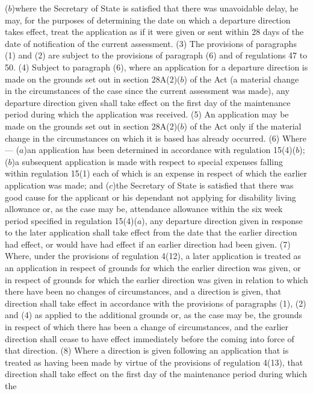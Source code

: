 \documentclass[a4paper]{article}
\begin{document}
($b$)where the Secretary of State is satisfied that there was unavoidable delay,
he may, for the purposes of determining the date on which a departure direction
takes effect, treat the application as if it were given or sent within 28 days
of the date of notification of the current assessment.
(3) The provisions of paragraphs (1) and (2) are subject to the provisions of
paragraph (6) and of regulations 47 to 50.
(4) Subject to paragraph (6), where an application for a departure direction is
made on the grounds set out in section 28A(2)($b$) of the Act (a material change
in the circumstances of the case since the current assessment was made), any
departure direction given shall take effect on the first day of the maintenance
period during which the application was received.
(5) An application may be made on the grounds set out in section 28A(2)($b$) of
the Act only if the material change in the circumstances on which it is based
has already occurred.
(6) Where—
($a$)an application has been determined in accordance with regulation 15(4)($b$);
($b$)a subsequent application is made with respect to special expenses falling
within regulation 15(1) each of which is an expense in respect of which the
earlier application was made; and
($c$)the Secretary of State is satisfied that there was good cause for the
applicant or his dependant not applying for disability living allowance or, as
the case may be, attendance allowance within the six week period specified in
regulation 15(4)($a$),
any departure direction given in response to the later application shall take
effect from the date that the earlier direction had effect, or would have had
effect if an earlier direction had been given.
(7) Where, under the provisions of regulation 4(12), a later application is
treated as an application in respect of grounds for which the earlier direction
was given, or in respect of grounds for which the earlier direction was given in
relation to which there have been no changes of circumstances, and a direction
is given, that direction shall take effect in accordance with the provisions of
paragraphs (1), (2) and (4) as applied to the additional grounds or, as the case
may be, the grounds in respect of which there has been a change of
circumstances, and the earlier direction shall cease to have effect immediately
before the coming into force of that direction.
(8) Where a direction is given following an application that is treated as
having been made by virtue of the provisions of regulation 4(13), that direction
shall take effect on the first day of the maintenance period during which the
\end{document}
